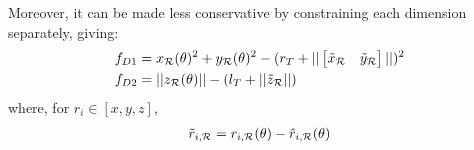 Moreover, it can be made less conservative by constraining each dimension separately, giving:
\begin{subequations}
\begin{align}
    f_{D1}&=x_{\mathcal{R}}(\theta)^2 + y_{\mathcal{R}}(\theta)^2 - (r_T+||\begin{bmatrix}
        \Tilde{x}_{\mathcal{R}}&\Tilde{y}_{\mathcal{R}}
    \end{bmatrix}||)^2\\
    f_{D2}&=||z_{\mathcal{R}}(\theta)|| - (l_T+||\Tilde{z}_{\mathcal{R}}||)
\end{align}
\end{subequations}
where, for $r_i\in[x,y,z]$,
\begin{align}
    \Tilde{r}_{i, {\mathcal{R}}}=r_{i, {\mathcal{R}}}(\theta)-\hat{r}_{i, {\mathcal{R}}}(\theta)
\end{align}